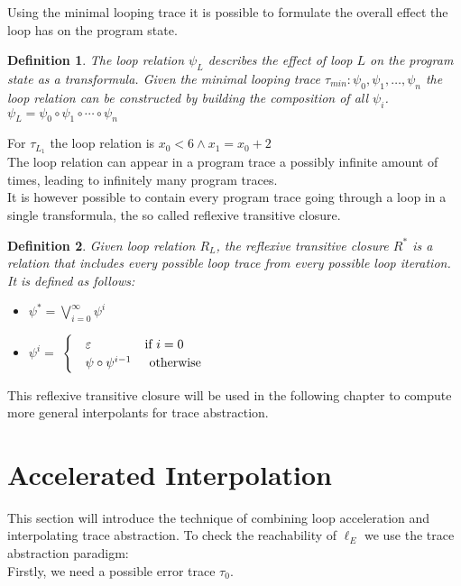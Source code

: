 \documentclass{article}
\newtheorem{mydef}{Definition}
\begin{document}
Using the minimal looping trace it is possible to formulate the overall effect the loop has on the program state.
\begin{mydef}
	The loop relation $\psi_L$ describes the effect of loop $L$ on the program state as a transformula.
	Given the minimal looping trace $\tau_{min}: \psi_0, \psi_1, \ldots, \psi_{n}$ the loop relation can be constructed by building the composition of all $\psi_i$.
	$\psi_L = \psi_0 \circ \psi_1 \circ \cdots \circ \psi_n$
\end{mydef}
For $\tau_{L_1}$ the loop relation is $x_0 < 6 \land x_1 = x_0 + 2$ \\
The loop relation can appear in a program trace a possibly infinite amount of times, leading to infinitely many program traces. \\
It is however possible to contain every program trace going through a loop in a single transformula, the so called reflexive transitive closure.
\begin{mydef}
	Given loop relation $R_L$, the reflexive transitive closure $R^*$ is a relation that includes every possible loop trace from every possible loop iteration. It is defined as follows:
	\begin{itemize}
		\item $\psi^* = \bigvee_{i=0}^\infty \psi^i$
		\item $\psi^i = $
		$\begin{cases}
			& \varepsilon \hspace{1.5cm} \text{if}\ i = 0 \\
			& \psi \circ \psi^{i - 1} \hspace{0.5cm}\text{otherwise}
		\end{cases}$
	\end{itemize}
\end{mydef}
This reflexive transitive closure will be used in the following chapter to compute more general interpolants for trace abstraction.

\section{Accelerated Interpolation}
This section will introduce the technique of combining loop acceleration and interpolating trace abstraction. 
To check the reachability of $\ell_E$ we use the trace abstraction paradigm: \\
Firstly, we need a possible error trace $\tau_0$. \\ \\
\end{document}
